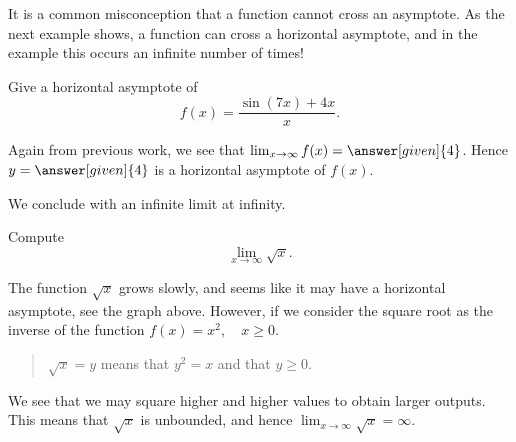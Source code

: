 \documentclass{ximera}
\begin{document}
It is a common misconception that a function cannot cross an
asymptote. As the next example shows, a function can cross a horizontal
asymptote, and in the example this occurs an infinite number of times!

\begin{example}
Give a horizontal asymptote of
\[
f(x) = \frac{\sin(7x)+4x}{x}.
\]
\begin{explanation}
Again from previous work, we see that $\lim_{x\to \infty} f(x) =
\answer[given]{4}$. Hence $y=\answer[given]{4}$ is a horizontal asymptote of $f(x)$.
\end{explanation}
\end{example}


We conclude with an infinite limit at infinity.

\begin{example}
Compute
\[

\lim_{x\to\infty}\sqrt{x}.
\]
\begin{image}
\end{image}
\begin{explanation}
The function $\sqrt{x}$ grows slowly, and seems like it may have a
horizontal asymptote, see the graph above. However, if we consider the
square root as the inverse of the function $f(x) = x^2 , \quad x \geq 0$.
\begin{quote}%
  $\sqrt{x} = y$ means that $y^2 = x$ and that $y \geq 0$.
\end{quote}
We see that we may square higher and higher values to obtain
larger outputs.  This means that $\sqrt{x}$ is unbounded, and hence
$\lim_{x\to\infty}\sqrt{x}=\infty$.
\end{explanation}
\end{example}
\end{document}

